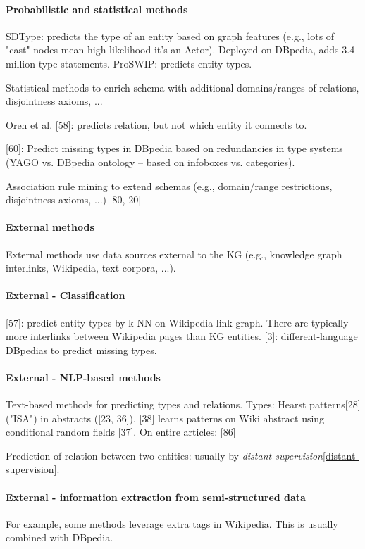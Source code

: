 \paragraph{Probabilistic and statistical methods}
SDType: predicts the type of an entity based on graph features (e.g., lots of
"cast" nodes mean high likelihood it's an Actor). Deployed on DBpedia, adds 3.4
million type statements.
ProSWIP: predicts entity types.

Statistical methods to enrich schema with additional domains/ranges of
relations, disjointness axioms, ...

Oren et al. [58]: predicts relation, but not which entity it connects to.

[60]: Predict missing types in DBpedia based on redundancies in type systems
(YAGO vs. DBpedia ontology -- based on infoboxes vs. categories).

Association rule mining to extend schemas (e.g., domain/range restrictions,
disjointness axioms, ...) [80, 20]

\paragraph{External methods}
External methods use data sources external to the KG (e.g., knowledge graph
interlinks, Wikipedia, text corpora, ...).

\paragraph{External - Classification}
[57]: predict entity types by k-NN on Wikipedia link graph.
There are typically more interlinks between Wikipedia pages than KG entities.
[3]: different-language DBpedias to predict missing types.

\paragraph{External - NLP-based methods}
Text-based methods for predicting types and relations.
Types: Hearst patterns[28] ("ISA") in abstracts ([23, 36]).
[38] learns patterns on Wiki abstract using conditional random fields [37].
On entire articles: [86]

Prediction of relation between two entities: usually by \textit{distant
supervision}\ref{distant-supervision}.

\paragraph{External - information extraction from semi-structured data}
For example, some methods leverage extra tags in Wikipedia.
This is usually combined with DBpedia.

